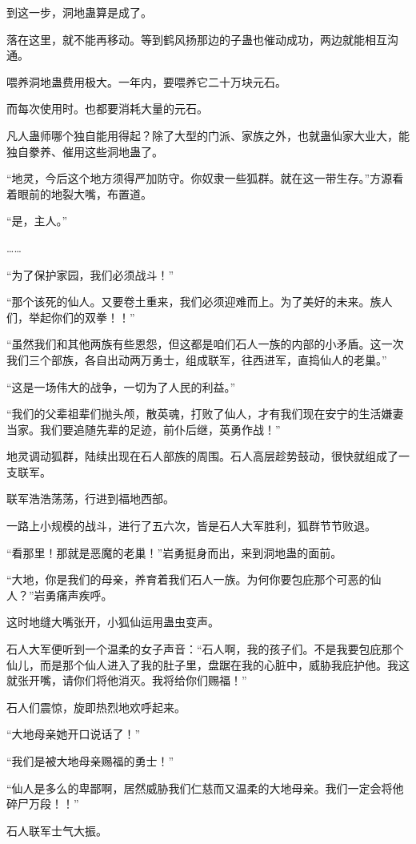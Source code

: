 \begin{this_body}
到这一步，洞地蛊算是成了。

落在这里，就不能再移动。等到鹤风扬那边的子蛊也催动成功，两边就能相互沟通。

喂养洞地蛊费用极大。一年内，要喂养它二十万块元石。

而每次使用时。也都要消耗大量的元石。

凡人蛊师哪个独自能用得起？除了大型的门派、家族之外，也就蛊仙家大业大，能独自豢养、催用这些洞地蛊了。

“地灵，今后这个地方须得严加防守。你奴隶一些狐群。就在这一带生存。”方源看着眼前的地裂大嘴，布置道。

“是，主人。”

……

“为了保护家园，我们必须战斗！”

“那个该死的仙人。又要卷土重来，我们必须迎难而上。为了美好的未来。族人们，举起你们的双拳！！”

“虽然我们和其他两族有些恩怨，但这都是咱们石人一族的内部的小矛盾。这一次我们三个部族，各自出动两万勇士，组成联军，往西进军，直捣仙人的老巢。”

“这是一场伟大的战争，一切为了人民的利益。”

“我们的父辈祖辈们抛头颅，散英魂，打败了仙人，才有我们现在安宁的生活嫌妻当家。我们要追随先辈的足迹，前仆后继，英勇作战！”

地灵调动狐群，陆续出现在石人部族的周围。石人高层趁势鼓动，很快就组成了一支联军。

联军浩浩荡荡，行进到福地西部。

一路上小规模的战斗，进行了五六次，皆是石人大军胜利，狐群节节败退。

“看那里！那就是恶魔的老巢！”岩勇挺身而出，来到洞地蛊的面前。

“大地，你是我们的母亲，养育着我们石人一族。为何你要包庇那个可恶的仙人？”岩勇痛声疾呼。

这时地缝大嘴张开，小狐仙运用蛊虫变声。

石人大军便听到一个温柔的女子声音：“石人啊，我的孩子们。不是我要包庇那个仙儿，而是那个仙人进入了我的肚子里，盘踞在我的心脏中，威胁我庇护他。我这就张开嘴，请你们将他消灭。我将给你们赐福！”

石人们震惊，旋即热烈地欢呼起来。

“大地母亲她开口说话了！”

“我们是被大地母亲赐福的勇士！”

“仙人是多么的卑鄙啊，居然威胁我们仁慈而又温柔的大地母亲。我们一定会将他碎尸万段！！”

石人联军士气大振。


\end{this_body}
